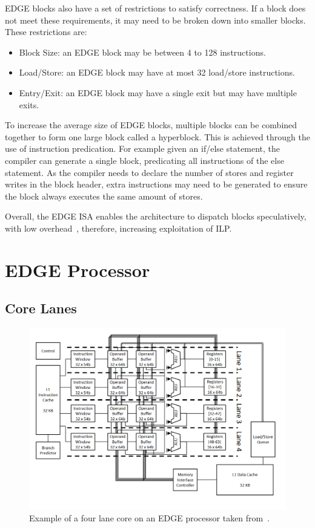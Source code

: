 EDGE blocks also have a set of restrictions to satisfy correctness.
If a block does not meet these requirements, it may need to be broken down into smaller blocks.
These restrictions are:

\begin{itemize}
\item Block Size: an EDGE block may be between 4 to 128 instructions.
\item Load/Store: an EDGE block may have at most 32 load/store instructions.
\item Entry/Exit: an EDGE block may have a single exit but may have multiple exits.
\end{itemize}

To increase the average size of EDGE blocks, multiple blocks can be combined together to form one large block called a hyperblock.
This is achieved through the use of instruction predication.
For example given an if/else statement, the compiler can generate a single block, predicating all instructions of the else statement.
As the compiler needs to declare the number of stores and register writes in the block header, extra instructions may need to be generated to ensure the block always executes the same amount of stores.

Overall, the EDGE ISA enables the architecture to dispatch blocks speculatively, with low overhead~\cite{putnam2010e2,kim2007tflex}, therefore, increasing exploitation of ILP.

\section{EDGE Processor}

\subsection{Core Lanes}
 \begin{figure}[t]
 \center
 \includegraphics[width=1\textwidth]{background/graphics/e2segment.png}
 \caption{Example of a four lane core on an EDGE processor taken from~\cite{e2smith}.}\label{fig:e2segment}
 \end{figure}
 
